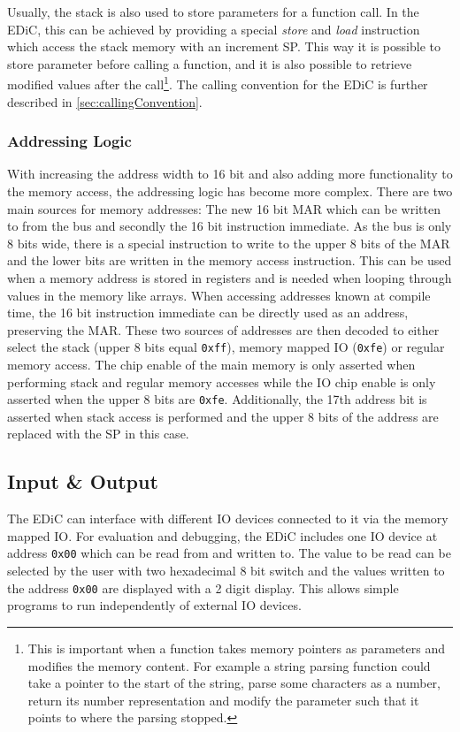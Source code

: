 Usually, the stack is also used to store parameters for a function call.
In the \gls{EDiC}, this can be achieved by providing a special \emph{store} and \emph{load} instruction which access the stack memory with an increment \gls{SP}.
This way it is possible to store parameter before calling a function, and it is also possible to retrieve modified values after the call\footnote{This is important when a function takes memory pointers as parameters and modifies the memory content. For example a string parsing function could take a pointer to the start of the string, parse some characters as a number, return its number representation and modify the parameter such that it points to where the parsing stopped.}.
The calling convention for the \gls{EDiC} is further described in \cref{sec:callingConvention}.

\subsubsection{Addressing Logic}\label{sec:addrLogic}
With increasing the address width to 16 bit and also adding more functionality to the memory access, the addressing logic has become more complex.
There are two main sources for memory addresses: The new 16 bit \gls{MAR} which can be written to from the bus and secondly the 16 bit instruction immediate.
As the bus is only 8 bits wide, there is a special instruction to write to the upper 8 bits of the \gls{MAR} and the lower bits are written in the memory access instruction.
This can be used when a memory address is stored in registers and is needed when looping through values in the memory like arrays.
When accessing addresses known at compile time, the 16 bit instruction immediate can be directly used as an address, preserving the \gls{MAR}.
These two sources of addresses are then decoded to either select the stack (upper 8 bits equal \texttt{0xff}), memory mapped \gls{IO} (\texttt{0xfe}) or regular memory access.
The chip enable of the main memory is only asserted when performing stack and regular memory accesses while the \gls{IO} chip enable is only asserted when the upper 8 bits are \texttt{0xfe}.
Additionally, the 17th address bit is asserted when stack access is performed and the upper 8 bits of the address are replaced with the \gls{SP} in this case.

\subsection{Input \& Output}\label{sec:IO}
The \gls{EDiC} can interface with different \gls{IO} devices connected to it via the memory mapped \gls{IO}.
For evaluation and debugging, the \gls{EDiC} includes one \gls{IO} device at address \texttt{0x00} which can be read from and written to.
The value to be read can be selected by the user with two hexadecimal 8 bit switch and the values written to the address \texttt{0x00} are displayed with a 2 digit display.
This allows simple programs to run independently of external \gls{IO} devices.

